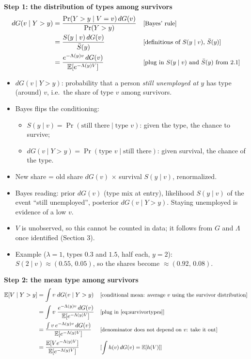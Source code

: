 \documentclass[11pt]{article}
\newcommand{\E}{\mathbb{E}}
\newcommand{\1}{\mathbf{1}}
\newcommand{\why}[1]{\text{\small[#1]}}
\begin{document}
\textbf{Step 1: the distribution of types among survivors}
\begin{align}
  dG(v\mid Y>y) &= \frac{\Pr(Y>y\mid V=v)\,dG(v)}{\Pr(Y>y)} && \why{Bayes' rule} \nonumber\\
  &= \frac{S(y\mid v)\,dG(v)}{\bar S(y)} && \why{definitions of $S(y\mid v)$, $\bar S(y)$} \nonumber\\
  &= \frac{e^{-\Lambda(y)v}\,dG(v)}{\E[e^{-\Lambda(y)V}]} && \why{plug in $S(y\mid v)$ and $\bar S(y)$ from 2.1} \label{eq:survivortypes}
\end{align}
\begin{itemize}
  \item $dG(v\mid Y>y)$: probability that a person \emph{still unemployed at $y$} has type (around) $v$, i.e.\ the share of type $v$ among survivors.
  \item Bayes flips the conditioning:
    \begin{itemize}
      \item $S(y\mid v)=\Pr(\text{still there}\mid\text{type }v)$: given the type, the chance to survive;
      \item $dG(v\mid Y>y)=\Pr(\text{type }v\mid\text{still there})$: given survival, the chance of the type.
    \end{itemize}
  \item New share = old share $dG(v)$ $\times$ survival $S(y\mid v)$, renormalized.
  \item Bayes reading: prior $dG(v)$ (type mix at entry), likelihood $S(y\mid v)$ of the event ``still unemployed'', posterior $dG(v\mid Y>y)$. Staying unemployed is evidence of a low $v$.
  \item $V$ is unobserved, so this cannot be counted in data; it follows from $G$ and $\Lambda$ once identified (Section 3).
  \item Example ($\lambda=1$, types $0.3$ and $1.5$, half each, $y=2$): $S(2\mid v)\approx(0.55,\,0.05)$, so the shares become $\approx(0.92,\,0.08)$.
\end{itemize}

\textbf{Step 2: the mean type among survivors}
\begin{align}
  \E[V\mid Y>y] &= \int v\;dG(v\mid Y>y) && \why{conditional mean: average $v$ using the survivor distribution} \nonumber\\
  &= \int v\;\frac{e^{-\Lambda(y)v}\,dG(v)}{\E[e^{-\Lambda(y)V}]} && \why{plug in \eqref{eq:survivortypes}} \nonumber\\
  &= \frac{\int v\,e^{-\Lambda(y)v}\,dG(v)}{\E[e^{-\Lambda(y)V}]} && \why{denominator does not depend on $v$: take it out} \nonumber\\
  &= \frac{\E[V e^{-\Lambda(y)V}]}{\E[e^{-\Lambda(y)V}]} && \why{$\int h(v)\,dG(v)=\E[h(V)]$} \label{eq:survmeanexp}
\end{align}
\end{document}
